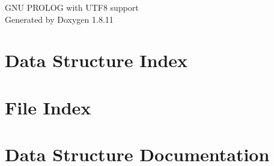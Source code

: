 \documentclass[twoside]{book}
\newcommand{\+}{\discretionary{\mbox{\scriptsize$\hookleftarrow$}}{}{}}
\newcommand{\clearemptydoublepage}{%
  \newpage{\pagestyle{empty}\cleardoublepage}%
}
\begin{document}
\hypersetup{pageanchor=false,
             bookmarksnumbered=true,
             pdfencoding=unicode
            }
\begin{titlepage}
\vspace*{7cm}
\begin{center}%
{\Large G\+NU P\+R\+O\+L\+OG with U\+T\+F8 support }\\
\vspace*{1cm}
{\large Generated by Doxygen 1.8.11}\\
\end{center}
\end{titlepage}
\clearemptydoublepage
\tableofcontents
\clearemptydoublepage
{}
\hypersetup{pageanchor=true}

\chapter{Data Structure Index}

\chapter{File Index}

\chapter{Data Structure Documentation}














































































\end{document}
